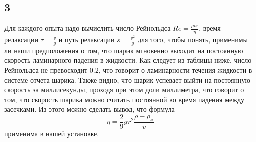\subsection*{3}
Для каждого опыта надо вычислить число Рейнольдса $Re=\frac{\rho v r}{\eta}$, время релаксации $\tau = \frac{v}{g}$ и путь релаксации $s = \frac{v^2}{g}$ для того, чтобы понять, применимы ли наши предположения о том, что шарик мгновенно выходит на постоянную скорость ламинарного падения в жидкости. Как следует из таблицы ниже, число Рейнольдса не превосходит 0.2, что говорит о ламинарности течения жидкости в системе отчета шарика. Также видно, что шарик успевает выйти на постоянную скорость за миллисекунды, проходя при этом доли миллиметра, что говорит о том, что скорость шарика можно считать постоянной во время падения между засечками. Из этого можно сделать вывод, что формула
$$\eta=\frac{2}{9}gr^2\frac{\rho-\rho_\text{ж}}{v}$$
применима в нашей установке.
\newpage
